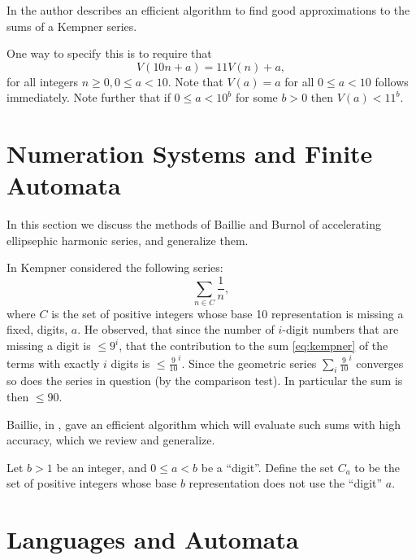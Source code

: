 \documentclass{article}
\begin{document}
In \cite{baillie1979sums} the author describes an efficient
algorithm to find good approximations to the sums of a Kempner series.

One way to specify this is to require that
\begin{equation}
  \label{eq:basic}
  V(10 n + a) = 11 V(n) + a,
\end{equation}
for all integers $n \ge 0, 0 \le a < 10$. Note that $V(a) = a$ for all
$0 \le a < 10$ follows immediately. Note further that if $0 \le a <
10^b$ for some $b > 0$ then $V(a) < 11^b$.

\section{Numeration Systems and Finite Automata}
\label{sec:numeration}

In this section we discuss the methods of Baillie and Burnol of
accelerating ellipsephic harmonic series, and generalize them.

In \cite{kempner1914curious} Kempner considered the following series:
\begin{equation}
  \label{eq:kempner}
  \sum_{n \in C}\frac{1}{n},
\end{equation}
where $C$ is the set of positive integers whose base 10 representation
is missing a fixed, digits, $a$.
He observed, that since the number
of $i$-digit numbers that are missing a digit is $\le 9^i$, that the
contribution to the sum \eqref{eq:kempner} of the terms with exactly
$i$ digits is $\le \frac{9}{10}^i$. Since the geometric series
$\sum_i \frac{9}{10}^i$ converges so does the series in question (by
the comparison test). In particular the sum is then $\le 90$.

Baillie, in \cite{baillie1979sums}, gave an efficient algorithm which
will evaluate such sums with high accuracy, which we review and generalize.

Let $b > 1$ be an integer, and $0 \le a < b$ be a ``digit''. Define
the set $C_a$ to be the set of positive integers whose base $b$
representation does not use the ``digit'' $a$.

\section{Languages and Automata}
\label{sec:language}
\end{document}
